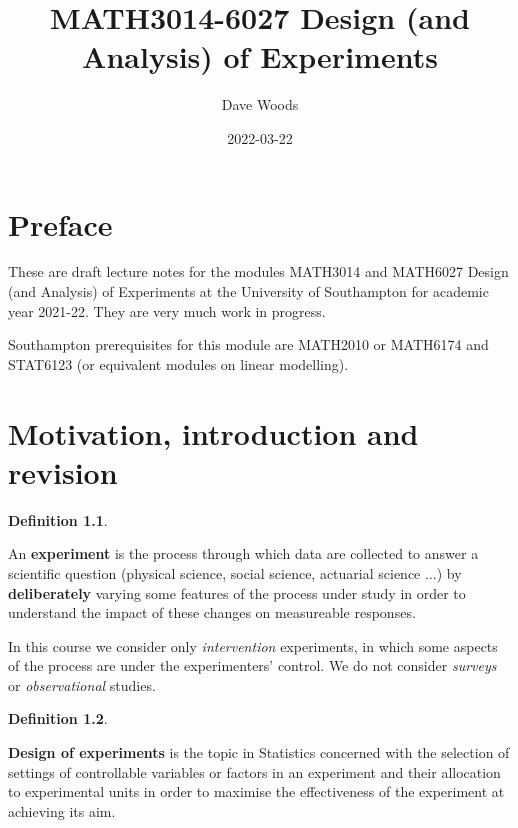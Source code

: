 \documentclass[
]{book}
\title{MATH3014-6027 Design (and Analysis) of Experiments}
\author{Dave Woods}
\date{2022-03-22}
\theoremstyle{definition}
\newtheorem{definition}{Definition}[chapter]
\theoremstyle{definition}
\theoremstyle{definition}
\theoremstyle{definition}
\theoremstyle{remark}
\begin{document}
\maketitle

{
\setcounter{tocdepth}{1}
\tableofcontents
}
\hypertarget{preface}{%
\chapter*{Preface}\label{preface}}

These are draft lecture notes for the modules MATH3014 and MATH6027 Design (and Analysis) of Experiments at the University of Southampton for academic year 2021-22. They are very much work in progress.

Southampton prerequisites for this module are MATH2010 or MATH6174 and STAT6123 (or equivalent modules on linear modelling).

\newcommand{\bx}{\boldsymbol{x}}
\newcommand{\btheta}{\boldsymbol{\theta}}
\newcommand{\bbeta}{\boldsymbol{\beta}}
\newcommand{\bvarepsilon}{\boldsymbol{\varepsilon}}
\newcommand{\by}{\boldsymbol{y}}
\newcommand{\rT}{\mathrm{T}}
\newcommand{\Var}{\operatorname{Var}}
\newcommand{\bY}{\boldsymbol{y}}
\newcommand{\btau}{\boldsymbol{\tau}}

\hypertarget{intro}{%
\chapter{Motivation, introduction and revision}\label{intro}}

\begin{definition}
\protect\hypertarget{def:exp}{}\label{def:exp}

An \textbf{experiment} is the process through which data are collected to answer a scientific question (physical science, social science, actuarial science \(\dots\)) by \textbf{deliberately} varying some features of the process under study in order to understand the impact of these changes on measureable responses.

In this course we consider only \emph{intervention} experiments, in which some aspects of the process are under the experimenters' control. We do not consider \emph{surveys} or \emph{observational} studies.

\end{definition}

\begin{definition}
\protect\hypertarget{def:design}{}\label{def:design}

\textbf{Design of experiments} is the topic in Statistics concerned with the selection of settings of controllable variables or factors in an experiment and their allocation to experimental units in order to maximise the effectiveness of the experiment at achieving its aim.

\end{definition}
\end{document}
